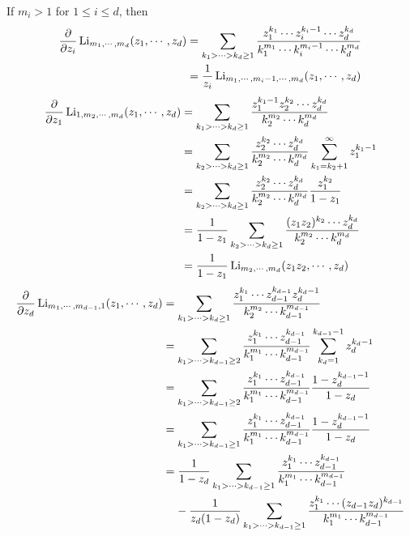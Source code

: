 \documentclass[main]{subfiles}
\begin{document}
\begin{exercise} \hfill \par
If $m_i>1$ for $1\leq i\leq d$, then
\begin{align*}
\dfrac{\partial}{\partial z_i}\operatorname{Li}_{m_1,\cdots,m_d}(z_1,\cdots,z_d)&=\sum_{k_1>\cdots>k_d\geq1}\frac{z_1^{k_1}\cdots z_i^{k_i-1}\cdots z_d^{k_d}}{k_1^{m_1}\cdots k_i^{m_i-1}\cdots k_d^{m_d}} \\
&=\dfrac{1}{z_i}\operatorname{Li}_{m_1,\cdots,m_i-1,\cdots,m_d}(z_1,\cdots,z_d)
\end{align*}
\begin{align*}
\dfrac{\partial}{\partial z_1}\operatorname{Li}_{1,m_2,\cdots,m_d}(z_1,\cdots,z_d)&=\sum_{k_1>\cdots>k_d\geq1}\frac{z_1^{k_1-1}z_2^{k_2}\cdots z_d^{k_d}}{k_2^{m_2}\cdots k_d^{m_d}} \\
&=\sum_{k_2>\cdots>k_d\geq1}\frac{z_2^{k_2}\cdots z_d^{k_d}}{k_2^{m_2}\cdots k_d^{m_d}}\sum_{k_1=k_2+1}^{\infty}z_1^{k_1-1} \\
&=\sum_{k_2>\cdots>k_d\geq1}\frac{z_2^{k_2}\cdots z_d^{k_d}}{k_2^{m_2}\cdots k_d^{m_d}}\frac{z_1^{k_2}}{1-z_1} \\
&=\frac{1}{1-z_1}\sum_{k_2>\cdots>k_d\geq1}\frac{(z_1z_2)^{k_2}\cdots z_d^{k_d}}{k_2^{m_2}\cdots k_d^{m_d}} \\
&=\frac{1}{1-z_1}\operatorname{Li}_{m_2,\cdots,m_d}(z_1z_2,\cdots,z_d)
\end{align*}
\begin{align*}
\dfrac{\partial}{\partial z_d}\Li_{m_1,\cdots,m_{d-1},1}(z_1,\cdots,z_d)&=\sum_{k_1>\cdots>k_d\geq1}\frac{z_1^{k_1}\cdots z_{d-1}^{k_{d-1}}z_d^{k_d-1}}{k_2^{m_2}\cdots k_{d-1}^{m_{d-1}}} \\
&=\sum_{k_1>\cdots>k_{d-1}\geq2}\frac{z_1^{k_1}\cdots z_{d-1}^{k_{d-1}}}{k_1^{m_1}\cdots k_{d-1}^{m_{d-1}}}\sum_{k_d=1}^{k_{d-1}-1}z_d^{k_{d}-1} \\
&=\sum_{k_1>\cdots>k_{d-1}\geq2}\frac{z_1^{k_1}\cdots z_{d-1}^{k_{d-1}}}{k_1^{m_1}\cdots k_{d-1}^{m_{d-1}}}\frac{1-z_d^{k_{d-1}-1}}{1-z_d} \\
&=\sum_{k_1>\cdots>k_{d-1}\geq1}\frac{z_1^{k_1}\cdots z_{d-1}^{k_{d-1}}}{k_1^{m_1}\cdots k_{d-1}^{m_{d-1}}}\frac{1-z_d^{k_{d-1}-1}}{1-z_d} \\
&=\frac{1}{1-z_d}\sum_{k_1>\cdots>k_{d-1}\geq1}\frac{z_1^{k_1}\cdots z_{d-1}^{k_{d-1}}}{k_1^{m_1}\cdots k_{d-1}^{m_{d-1}}} \\
&\mkern20mu-\frac{1}{z_d(1-z_d)}\sum_{k_1>\cdots>k_{d-1}\geq1}\frac{z_1^{k_1}\cdots (z_{d-1}z_d)^{k_{d-1}}}{k_1^{m_1}\cdots k_{d-1}^{m_{d-1}}} \\

\end{align*}
\end{exercise}
\end{document}
